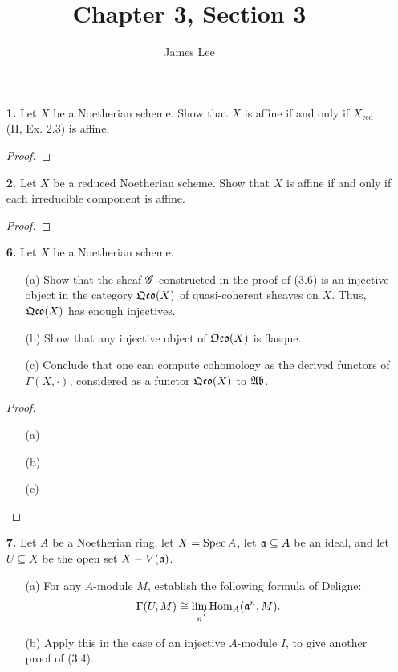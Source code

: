 \documentclass{article}
\title{Chapter 3, Section 3}
\author{James Lee}
\begin{document}
\maketitle
\begin{enumerate} [label=\textbf{\arabic*.}, leftmargin=0em]

\item[\textbf{1.}] Let $X$ be a Noetherian scheme.
Show that $X$ is affine if and only if $X_\text{red}$ (II, Ex. 2.3) is affine.

\begin{proof}

\end{proof}

\item[\textbf{2.}] Let $X$ be a reduced Noetherian scheme.
Show that $X$ is affine if and only if each irreducible component is affine.

\begin{proof}
  
\end{proof}

\item[\textbf{6.}] Let $X$ be a Noetherian scheme.
\begin{itemize}
  \item[(a)] Show that the sheaf $\mathscr{G}$ constructed in the proof of (3.6) is an injective object in the category $\mathfrak{Qco}(X)$ of quasi-coherent sheaves on $X$.
  Thus, $\mathfrak{Qco}(X)$ has enough injectives.

  \item[(b)] Show that any injective object of $\mathfrak{Qco}(X)$ is flasque.

  \item[(c)] Conclude that one can compute cohomology as the derived functors of $\Gamma(X, \cdot)$, considered as a functor $\mathfrak{Qco}(X)$ to $\mathfrak{Ab}$.
\end{itemize}

\begin{proof} $ $ \vspace{0pt}
\begin{itemize} [leftmargin=0cm]
\item[(a)]

\item[(b)]

\item[(c)]
\end{itemize} 
\end{proof}

\item[\textbf{7.}] Let $A$ be a Noetherian ring, let $X = \operatorname{Spec}{A}$, let $\mathfrak{a} \subseteq A$ be an ideal, and let $U \subseteq X$ be the open set $X - V(\mathfrak{a})$.
\begin{itemize}
  \item[(a)] For any $A$-module $M$, establish the following formula of Deligne:
  \begin{equation*}
    \Gamma(U, \tilde{M}) \cong \varinjlim_n{\text{Hom}_A(\mathfrak{a}^n, M)}.
  \end{equation*}
  \item[(b)] Apply this in the case of an injective $A$-module $I$, to give another proof of (3.4).
\end{itemize}


\end{enumerate}
\end{document}
